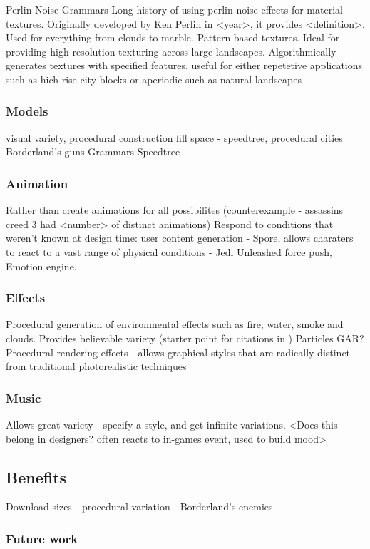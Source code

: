 \documentclass{./acm_proc_article-sp}
\begin{document}
Perlin Noise
Grammars
Long history of using perlin noise effects for material textures. Originally developed by Ken Perlin in <year>, it provides <definition>. Used for everything from clouds to marble.
Pattern-based textures. Ideal for providing high-resolution texturing across large landscapes. Algorithmically generates textures with specified features, useful for either repetetive applications such as hich-rise city blocks or aperiodic such as natural landscapes \cite{patternTextures}
\subsubsection{Models}
visual variety, procedural construction
fill space - speedtree\cite{speedtree}, procedural cities
Borderland's guns
Grammars
Speedtree
\subsubsection{Animation}
Rather than create animations for all possibilites (counterexample - assassins creed 3 had <number> of distinct animations)
Respond to conditions that weren't known at design time: user content generation - Spore\cite{Spore}, allows charaters to react to a vast range of physical conditions - Jedi Unleashed force push, Emotion engine.
\subsubsection{Effects}
Procedural generation of environmental effects such as fire, water, smoke and clouds. Provides believable variety (starter point for citations in \cite{hendrikx2012procedural})
Particles
GAR?
Procedural rendering effects - allows graphical styles that are radically distinct from traditional photorealistic techniques \cite{kowalski1999art}
\subsubsection{Music}
Allows great variety - specify a style, and get infinite variations. \cite{collins2009introduction} <Does this belong in designers? often reacts to in-games event, used to build mood>

\subsection{Benefits}
Download sizes - procedural variation - Borderland's enemies
\subsubsection{Future work}
\end{document}
